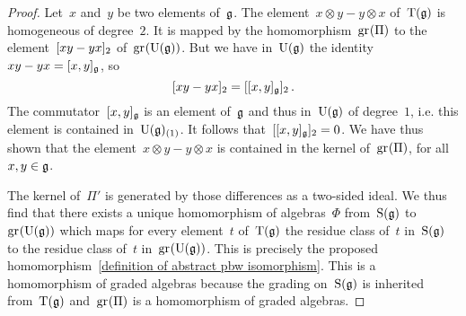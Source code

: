 \begin{proof}
  Let~$x$ and~$y$ be two elements of~$\mathfrak{g}$.
  The element~$x \otimes y - y \otimes x$ of~$\operatorname{T}(\mathfrak{g})$ is homogeneous of degree~$2$.
  It is mapped by the homomorphism~$\gr(\Pi)$ to the element~$\lbrack x y - y x \rbrack_2$ of~$\gr(\Univ(\glie))$.
  But we have in~$\operatorname{U}(\mathfrak{g})$ the identity~$xy - yx = [x,y]_{\mathfrak{g}}$, so
  \[
    \lbrack xy - yx \rbrack_2
    =
    \lbrack [x,y]_{\mathfrak{g}} \rbrack_2 \,.
  \]
  The commutator~$[x,y]_{\mathfrak{g}}$ is an element of~$\mathfrak{g}$ and thus in~$\operatorname{U}(\mathfrak{g})$ of degree~$1$, i.e. this element is contained in~$\operatorname{U}(\mathfrak{g})_{(1)}$.
  It follows that~$\lbrack [x,y]_{\mathfrak{g}} \rbrack_2 = 0$.
  We have thus shown that the element~$x \otimes y - y \otimes x$ is contained in the kernel of~$\gr(\Pi)$, for all~$x, y \in \mathfrak{g}$.

  The kernel of~$\Pi'$ is generated by those differences as a two-sided ideal.
  We thus find that there exists a unique homomorphism of algebras~$\Phi$ from~$\operatorname{S}(\mathfrak{g})$ to~$\gr(\Univ(\glie))$ which maps for every element~$t$ of~$\operatorname{T}(\mathfrak{g})$ the residue class of~$t$ in~$\operatorname{S}(\mathfrak{g})$ to the residue class of~$t$ in~$\gr( \Univ(\glie) )$.
  This is precisely the proposed homomorphism~\eqref{definition of abstract pbw isomorphism}.
  This is a homomorphism of graded algebras because the grading on~$\operatorname{S}(\mathfrak{g})$ is inherited from~$\operatorname{T}(\mathfrak{g})$ and~$\gr(\Pi)$ is a homomorphism of graded algebras.
  

\end{proof}
